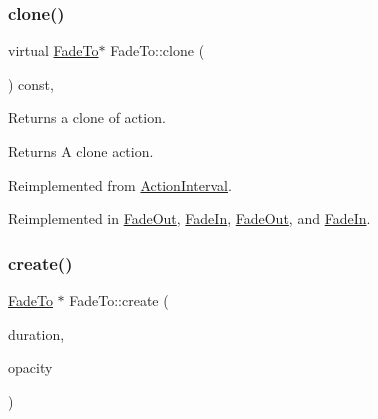 \mbox{\label{classFadeTo_a1968e50c43c66d7b7efd4a6718183c3c}} 
\subsubsection{\texorpdfstring{clone()}{clone()}\hspace{0.1cm}{\footnotesize\ttfamily [2/2]}}
{\footnotesize\ttfamily virtual \hyperlink{classFadeTo}{Fade\+To}$\ast$ Fade\+To\+::clone (\begin{DoxyParamCaption}\item[{void}]{ }\end{DoxyParamCaption}) const\hspace{0.3cm}{\ttfamily [override]}, {\ttfamily [virtual]}}

Returns a clone of action.

\begin{DoxyReturn}{Returns}
A clone action. 
\end{DoxyReturn}


Reimplemented from \hyperlink{classActionInterval_abc93ce0c2f54a90eb216a7803f25f44a}{Action\+Interval}.



Reimplemented in \hyperlink{classFadeOut_a03d1d3960ed0439bb40f120f14f1a4b5}{Fade\+Out}, \hyperlink{classFadeIn_a11f3037a54e9cb96655fe74f5f007c06}{Fade\+In}, \hyperlink{classFadeOut_af06dabca5e73a8ed67560c2540bbbb1f}{Fade\+Out}, and \hyperlink{classFadeIn_ab6e6999c3e68cc9157acabd0a7db06d5}{Fade\+In}.

\mbox{\label{classFadeTo_a5c86a750b0b092fb079ffb076e9ebf41}} 
\subsubsection{\texorpdfstring{create()}{create()}\hspace{0.1cm}{\footnotesize\ttfamily [1/2]}}
{\footnotesize\ttfamily \hyperlink{classFadeTo}{Fade\+To} $\ast$ Fade\+To\+::create (\begin{DoxyParamCaption}\item[{float}]{duration,  }\item[{G\+Lubyte}]{opacity }\end{DoxyParamCaption})\hspace{0.3cm}{\ttfamily [static]}}

